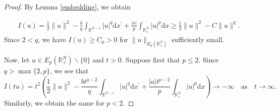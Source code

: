 \documentclass[12pt,reqno]{amsart}
\begin{document}
 \begin{proof} By Lemma \ref{embedding}, we obtain

\begin{align*}
    I(u)= \frac{1}{2}\|u\|^2 -\frac{b}{q}\int_{\mathds{R}^{N-1}}|u|^q\mathrm{d}x^\prime+\frac{|a|}{p}\int_{\mathds{R}^N_+}|u|^p\mathrm{d}x
    \geq \frac{1}{2}\|u\|^2 -C\|u\| ^q.
\end{align*}
 Since $2<q$, we have $I(u)\geq C_0>0$ for $\|u\|_{E_p(\mathds{R}^N_+)} $ sufficiently small. 
 
 Now, let $u \in E_p(\mathds{R}^N_+)\backslash\{0\}$ and $t>0$. Suppose first that $p\leq 2$. Since $q>\max\{2,p\}$, we see that 
 \begin{equation*}
     I(tu)=t^2\left(\frac{1}{2}\|u\|^2 -\frac{bt^{q-2}}{q}\int_{\mathds{R}^{N-1}}|u|^q\mathrm{d}x^\prime+ \frac{|a| t^{p-2}}{p} \int_{\mathds{R}^N_+} |u|^p  \mathrm{d}x \right)\longrightarrow -\infty\quad\mbox{as}\quad t\longrightarrow \infty.
 \end{equation*}
Similarly, we obtain the same for $p<2$.
\end{proof}
\end{document}

